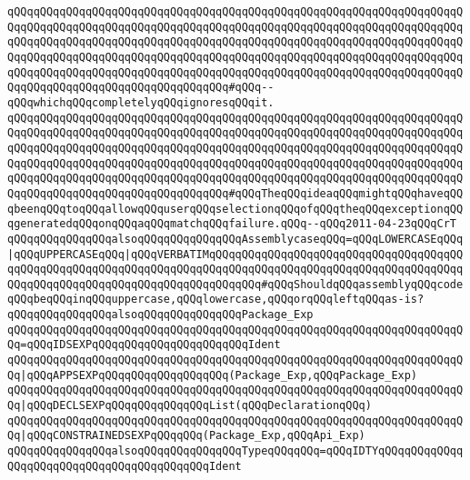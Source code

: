 \verb|qQQqqQQqqQQqqQQqqQQqqQQqqQQqqQQqqQQqqQQqqQQqqQQqqQQqqQQqqQQqqQQqqQQqqQQqqQQqqQQqqQQqqQQqqQQqqQQqqQQqqQQqqQQqqQQqqQQqqQQqqQQqqQQqqQQqqQQqqQQqqQQqqQQqqQQqqQQqqQQqqQQqqQQqqQQqqQQqqQQqqQQqqQQqqQQqqQQqqQQqqQQqqQQqqQQqqQQqqQQqqQQqqQQqqQQqqQQqqQQqqQQqqQQqqQQqqQQqqQQqqQQqqQQqqQQqqQQqqQQqqQQqqQQqqQQqqQQqqQQqqQQqqQQqqQQqqQQqqQQqqQQqqQQqqQQqqQQqqQQqqQQqqQQqqQQqqQQqqQQqqQQqqQQqqQQqqQQqqQQqqQQq#qQQq--qQQqwhichqQQqcompletelyqQQqignoresqQQqit.|\newline
\verb|qQQqqQQqqQQqqQQqqQQqqQQqqQQqqQQqqQQqqQQqqQQqqQQqqQQqqQQqqQQqqQQqqQQqqQQqqQQqqQQqqQQqqQQqqQQqqQQqqQQqqQQqqQQqqQQqqQQqqQQqqQQqqQQqqQQqqQQqqQQqqQQqqQQqqQQqqQQqqQQqqQQqqQQqqQQqqQQqqQQqqQQqqQQqqQQqqQQqqQQqqQQqqQQqqQQqqQQqqQQqqQQqqQQqqQQqqQQqqQQqqQQqqQQqqQQqqQQqqQQqqQQqqQQqqQQqqQQqqQQqqQQqqQQqqQQqqQQqqQQqqQQqqQQqqQQqqQQqqQQqqQQqqQQqqQQqqQQqqQQqqQQqqQQqqQQqqQQqqQQqqQQqqQQqqQQqqQQqqQQqqQQq#qQQqTheqQQqideaqQQqmightqQQqhaveqQQqbeenqQQqtoqQQqallowqQQquserqQQqselectionqQQqofqQQqtheqQQqexceptionqQQqgeneratedqQQqonqQQqaqQQqmatchqQQqfailure.qQQq--qQQq2011-04-23qQQqCrT|\newline
\newline
\verb|qQQqqQQqqQQqqQQqalsoqQQqqQQqqQQqqQQqAssemblycaseqQQq=qQQqLOWERCASEqQQq|\verb#|qQQqUPPERCASEqQQq|qQQqVERBATIMqQQqqQQqqQQqqQQqqQQqqQQqqQQqqQQqqQQqqQQqqQQqqQQqqQQqqQQqqQQqqQQqqQQqqQQqqQQqqQQqqQQqqQQqqQQqqQQqqQQqqQQqqQQqqQQqqQQqqQQqqQQqqQQqqQQqqQQqqQQqqQQqqQQq#\verb|#qQQqShouldqQQqassemblyqQQqcodeqQQqbeqQQqinqQQquppercase,qQQqlowercase,qQQqorqQQqleftqQQqas-is?|\newline
\newline
\verb|qQQqqQQqqQQqqQQqalsoqQQqqQQqqQQqqQQqPackage_Exp|\newline
\verb|qQQqqQQqqQQqqQQqqQQqqQQqqQQqqQQqqQQqqQQqqQQqqQQqqQQqqQQqqQQqqQQqqQQqqQQq=qQQqIDSEXPqQQqqQQqqQQqqQQqqQQqqQQqIdent|\newline
\verb|qQQqqQQqqQQqqQQqqQQqqQQqqQQqqQQqqQQqqQQqqQQqqQQqqQQqqQQqqQQqqQQqqQQqqQQq|\verb#|qQQqAPPSEXPqQQqqQQqqQQqqQQqqQQq(Package_Exp,qQQqPackage_Exp)#\newline
\verb|qQQqqQQqqQQqqQQqqQQqqQQqqQQqqQQqqQQqqQQqqQQqqQQqqQQqqQQqqQQqqQQqqQQqqQQq|\verb#|qQQqDECLSEXPqQQqqQQqqQQqqQQqList(qQQqDeclarationqQQq)#\newline
\verb|qQQqqQQqqQQqqQQqqQQqqQQqqQQqqQQqqQQqqQQqqQQqqQQqqQQqqQQqqQQqqQQqqQQqqQQq|\verb#|qQQqCONSTRAINEDSEXPqQQqqQQq(Package_Exp,qQQqApi_Exp)#\newline
\newline
\verb|qQQqqQQqqQQqqQQqalsoqQQqqQQqqQQqqQQqTypeqQQqqQQq=qQQqIDTYqQQqqQQqqQQqqQQqqQQqqQQqqQQqqQQqqQQqqQQqqQQqIdent|\newline
